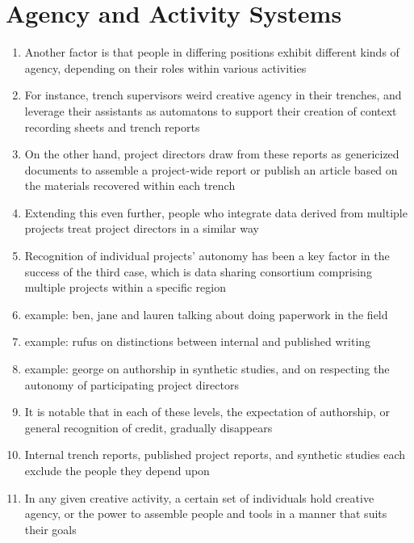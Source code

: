 \documentclass{article}
\begin{document}
\section{Agency and Activity Systems}
\begin{enumerate}
  \item Another factor is that people in differing positions exhibit different kinds of agency, depending on their roles within various activities
  \item For instance, trench supervisors weird creative agency in their trenches, and leverage their assistants as automatons to support their creation of context recording sheets and trench reports
  \item On the other hand, project directors draw from these reports as genericized documents to assemble a project-wide report or publish an article based on the materials recovered within each trench
  \item Extending this even further, people who integrate data derived from multiple projects treat project directors in a similar way
  \item Recognition of individual projects' autonomy has been a key factor in the success of the third case, which is data sharing consortium comprising multiple projects within a specific region
  \item example: ben, jane and lauren talking about doing paperwork in the field
  \item example: rufus on distinctions between internal and published writing
  \item example: george on authorship in synthetic studies, and on respecting the autonomy of participating project directors
  
  \item It is notable that in each of these levels, the expectation of authorship, or general recognition of credit, gradually disappears
  \item Internal trench reports, published project reports, and synthetic studies each exclude the people they depend upon
  \item In any given creative activity, a certain set of individuals hold creative agency, or the power to assemble people and tools in a manner that suits their goals
\end{enumerate}
\end{document}
